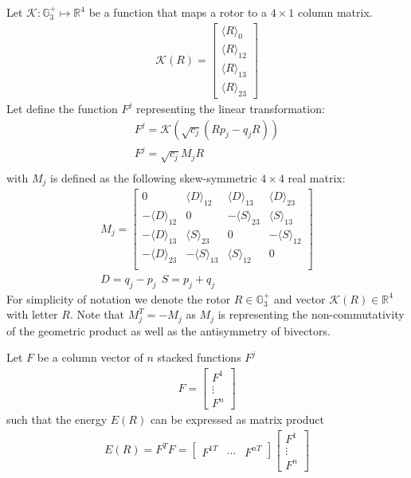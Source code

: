 \documentclass{birkjour}
\numberwithin{equation}{section}
\begin{document}
Let $\mathcal K : \mathbb{G}^{+}_3 \mapsto \mathbb{R}^4$ be a function that maps a rotor to a $4\times1$ column matrix. 
\begin{eqnarray*}
\mathcal K(R) = \left[\begin{array}{c} \langle R \rangle_0 \\ \langle R \rangle_{12} \\ \langle R \rangle_{13} \\ \langle R \rangle_{23} \end{array}\right]
\end{eqnarray*}
Let define the function $F^j$ representing the linear transformation:
\begin{eqnarray*}
F^j = \mathcal K(\sqrt{c_j} (R p_j - q_j R))\\
F^j = \sqrt{c_j} M_j R\\
\end{eqnarray*}
with $M_j$ is defined as the following skew-symmetric $4\times4$ real matrix:
\begin{eqnarray*}
M_j = 
\left[\begin{array}{cccc}
0                       & \langle D \rangle_{12} & \langle D \rangle_{13}  & \langle D \rangle_{23}\\
-\langle D \rangle_{12} &         0              & -\langle S \rangle_{23} & \langle S \rangle_{13}\\
-\langle D \rangle_{13} & \langle S \rangle_{23} &          0              & -\langle S \rangle_{12}\\
-\langle D \rangle_{23} & -\langle S \rangle_{13}& \langle S \rangle_{12}  &          0             \\
\end{array}\right]\\
D = q_j - p_j \ \ S = p_j + q_j
\end{eqnarray*}
For simplicity of notation we denote the rotor $R \in \mathbb{G}^{+}_3$ and vector $\mathcal K(R) \in \mathbb R^4$ with letter $R$.
Note that $M_j^T = -M_j$ as $M_j$ is representing the non-commutativity of the geometric product as well as the antisymmetry of bivectors.

Let $F$ be a column vector of $n$ stacked functions $F^j$
\begin{eqnarray*}
F = \left[\begin{array}{c}F^1 \\ \vdots \\ F^n\end{array}\right]
\end{eqnarray*}
 such that the energy $E(R)$ can be expressed as matrix product
\begin{eqnarray*}
E(R) = F^T F =
\left[\begin{array}{ccc}F^{1T} & \cdots & F^{nT}\end{array}\right]
\left[\begin{array}{c}F^1 \\ \vdots \\ F^n\end{array}\right]
\end{eqnarray*}
\end{document}
